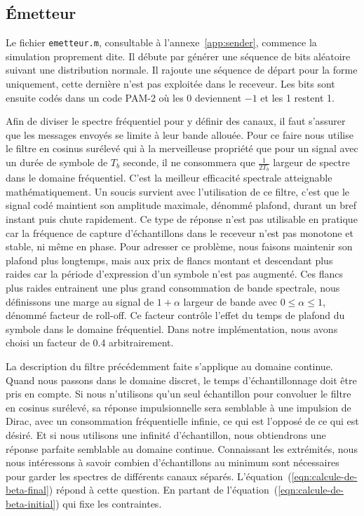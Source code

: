 \documentclass[10pt, oneside, a4paper]{article}
\begin{document}
\subsection{Émetteur}
Le fichier \texttt{emetteur.m}, consultable à l'annexe~\ref{app:sender}, commence la simulation proprement dite.
Il débute par générer une séquence de bits aléatoire suivant une distribution normale.
Il rajoute une séquence de départ pour la forme uniquement, cette dernière n'est pas exploitée dans le receveur.
Les bits sont ensuite codés dans un code PAM-2 où les 0 deviennent $-1$ et les 1 restent 1.

Afin de diviser le spectre fréquentiel pour y définir des canaux, il faut s'assurer que les messages envoyés se limite à leur bande allouée.
Pour ce faire nous utilise le filtre en cosinus surélevé qui à la merveilleuse propriété que pour un signal avec un durée de symbole de $T_b$ seconde, il ne consommera que $\frac{1}{2T_b}$ largeur de spectre dans le domaine fréquentiel.
C'est la meilleur efficacité spectrale atteignable mathématiquement.
Un soucis survient avec l'utilisation de ce filtre, c'est que le signal codé maintient son amplitude maximale, dénommé plafond, durant un bref instant puis chute rapidement.
Ce type de réponse n'est pas utilisable en pratique car la fréquence de capture d'échantillons dans le receveur n'est pas monotone et stable, ni même en phase.
Pour adresser ce problème, nous faisons maintenir son plafond plus longtemps, mais aux prix de flancs montant et descendant plus raides car la période d'expression d'un symbole n'est pas augmenté.
Ces flancs plus raides entrainent une plus grand consommation de bande spectrale, nous définissons une marge au signal de $1+\alpha$ largeur de bande avec $0\leq\alpha\leq1$, dénommé \og{}facteur de roll-off\fg{}.
Ce facteur contrôle l'effet du temps de plafond du symbole dans le domaine fréquentiel.
Dans notre implémentation, nous avons choisi un facteur de \num{0.4} arbitrairement.

La description du filtre précédemment faite s'applique au domaine continue.
Quand nous passons dans le domaine discret, le temps d'échantillonnage doit être pris en compte.
Si nous n'utilisons qu'un seul échantillon pour convoluer le filtre en cosinus surélevé, sa réponse impulsionnelle sera semblable à une impulsion de Dirac, avec un consommation fréquentielle infinie, ce qui est l'opposé de ce qui est désiré.
Et si nous utilisons une infinité d'échantillon, nous obtiendrons une réponse parfaite semblable au domaine continue.
Connaissant les extrémités, nous nous intéressons à savoir combien d'échantillons au minimum sont nécessaires pour garder les spectres de différents canaux séparés.
L'équation~(\ref{eqn:calcule-de-beta-final}) répond à cette question.
En partant de l'équation~(\ref{eqn:calcule-de-beta-initial}) qui fixe les contraintes.
\end{document}
